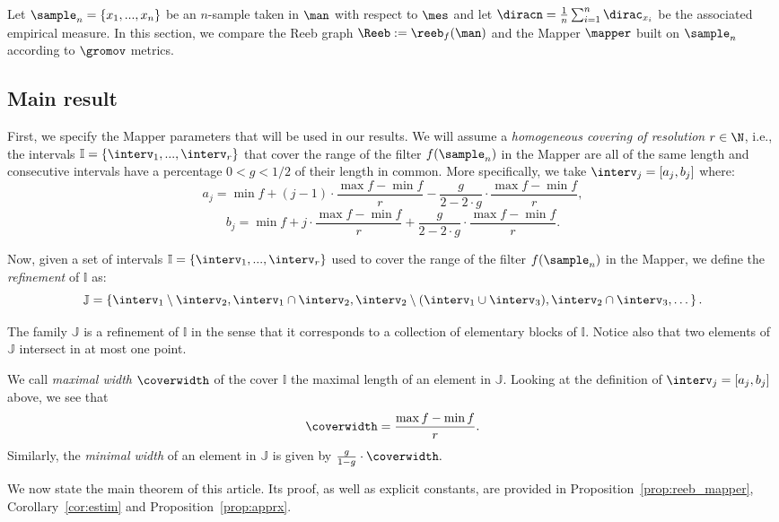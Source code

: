 Let $\sample_n=\{x_1,...,x_n\}$ be an $n$-sample taken in $\man$ with respect to $\mes$ and let $\diracn=\frac{1}{n}\sum_{i=1}^n \dirac_{x_i}$ be the associated empirical measure. In this section, we compare the Reeb graph $\Reeb:=\reeb_f(\man)$ and the Mapper $\mapper$ built on $\sample_n$ according to $\gromov$ metrics.


\subsection{Main result}
First, we specify the Mapper parameters that will be used in our results.
We will assume a {\em homogeneous covering of resolution} $r\in\N$, i.e., the intervals $\mathbb{I}=\{\interv_1,...,\interv_r\}$ that cover the range of the filter $f(\sample_n)$ in the Mapper are all of the same length and consecutive intervals have a percentage $0<g<1/2$ of their length in common. More specifically, we take $\interv_j=[a_j,b_j]$ where:
$$a_j=\min f+(j-1)\cdot\frac{\max f-\min f}{r}-\frac{g}{2-2\cdot g}\cdot\frac{\max f - \min f}{r},$$
$$b_j=\min f+j\cdot\frac{\max f-\min f}{r}+\frac{g}{2-2\cdot g}\cdot\frac{\max f - \min f}{r}.$$

Now, given a set of intervals $\mathbb{I}=\{\interv_1,...,\interv_r\}$ used to cover the range of the filter $f(\sample_n)$ in the Mapper, we define the {\em refinement} of $\mathbb{I}$ as:
$$\mathbb{J}=\left\{\interv_1\setminus\interv_2,\interv_1\cap\interv_2,\interv_2\setminus(\interv_1\cup\interv_3),\interv_2\cap\interv_3,\dots\right\}.$$

The family $\mathbb{J}$ is a refinement of $\mathbb{I}$ in the sense that it corresponds to a collection of elementary blocks of $\mathbb{I}$. Notice also that two elements of $\mathbb{J}$ intersect in at most one point. 

We call {\em maximal width} $\coverwidth$ of the cover $\mathbb{I}$ the maximal length of an element in $\mathbb{J}$. Looking at the definition of $\interv_j=[a_j,b_j]$ above, we see that
$$\coverwidth=\frac{\max f - \min f}{r}.$$ 
Similarly, the {\em minimal width} of an element in $\mathbb{J}$ is given by 
 $\frac{g}{1-g}\cdot\coverwidth.$ 

We now state the main theorem of this article. %
Its proof, as well as explicit constants, are provided in Proposition~\ref{prop:reeb_mapper}, Corollary~\ref{cor:estim} and Proposition~\ref{prop:apprx}.

